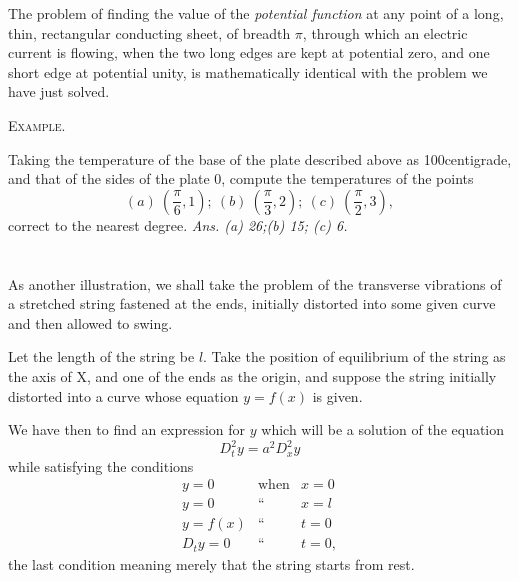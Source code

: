\documentclass[oneside,12pt]{book}
\begin{document}
The problem of finding the value of the \textit{potential function} at any point of a long, thin, rectangular conducting sheet, of breadth $\pi$, through which an electric current is flowing, when the two long edges are kept at potential zero, and one short edge at potential unity, is mathematically identical with the problem we have just solved. \par 
\begin{center}
    \textsc{Example.}
\end{center} \par
Taking the temperature of the base of the plate described above as 100\textdegree centigrade, and that of the sides of the plate 0\textdegree, compute the temperatures of the points 
$$(a)\ (\frac{\pi}{6},1);\ (b)\ (\frac{\pi}{3},2);\ (c)\ (\frac{\pi}{2},3),$$
correct to the nearest degree. \hfill \textit{Ans. (a) 26\textdegree;(b) 15\textdegree; (c) 6\textdegree.} \par 

\section{} As another illustration, we shall take the problem of the transverse vibrations of a stretched string fastened at the ends, initially distorted into some given curve and then allowed to swing. \par 

Let the length of the string be $l$. Take the position of equilibrium of the string as the axis of X, and one of the ends as the origin, and suppose the string initially distorted into a curve whose equation $y=f(x)$ is given. \par 

We have then to find an expression for $y$ which will be a solution of the equation 
\begin{equation}
    D_t^2y=a^2D_x^2y
    \tag{VIII Art. 1,}
    \label{eq8Art}
\end{equation}
while satisfying the conditions 
\setcounter{equation}{0}
\begin{eqnarray}
    y=0 & \text{when} & x=0 \label{con8.1}\\
    y=0 & \text{``} & x=l \label{con8.2}\\
    y=f(x) & \text{``} & t=0 \label{con8.3}\\
    D_ty=0 & \text{``} & t=0 \label{con8.4}, 
\end{eqnarray}
the last condition meaning merely that the string starts from rest. \par 
\end{document}
